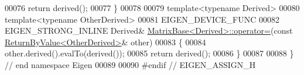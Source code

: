 \begin{DoxyCode}
00076   \textcolor{keywordflow}{return} derived();
00077 \}
00078 
00079 \textcolor{keyword}{template}<\textcolor{keyword}{typename} Derived>
00080 \textcolor{keyword}{template}<\textcolor{keyword}{typename} OtherDerived>
00081 EIGEN\_DEVICE\_FUNC
00082 EIGEN\_STRONG\_INLINE Derived& \hyperlink{group___core___module_a706a4dd1ee54786e9210de1a4bf02600}{MatrixBase<Derived>::operator=}(\textcolor{keyword}{const} 
      \hyperlink{group___core___module_class_eigen_1_1_return_by_value}{ReturnByValue<OtherDerived>}& other)
00083 \{
00084   other.derived().evalTo(derived());
00085   \textcolor{keywordflow}{return} derived();
00086 \}
00087 
00088 \} \textcolor{comment}{// end namespace Eigen}
00089 
00090 \textcolor{preprocessor}{#endif // EIGEN\_ASSIGN\_H}
\end{DoxyCode}
